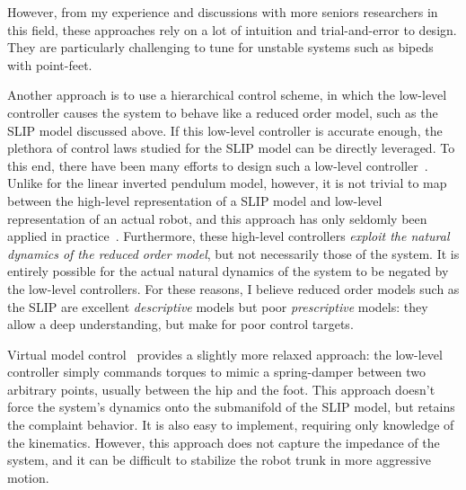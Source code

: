 However, from my experience and discussions with more seniors researchers in this field, these approaches rely on a lot of intuition and trial-and-error to design. They are particularly challenging to tune for unstable systems such as bipeds with point-feet. \par
Another approach is to use a hierarchical control scheme, in which the low-level controller causes the system to behave like a reduced order model, such as the SLIP model discussed above.
If this low-level controller is accurate enough, the plethora of control laws studied for the SLIP model can be directly leveraged. To this end, there have been many efforts to design such a low-level controller~\cite{hutter2010slip,poulakakis2009spring,wensing2013high}. Unlike for the linear inverted pendulum model, however, it is not trivial to map between the high-level representation of a SLIP model and low-level representation of an actual robot, and this approach has only seldomly been applied in practice~\cite{martin2017experimental}.
Furthermore, these high-level controllers \emph{exploit the natural dynamics of the reduced order model}, but not necessarily those of the system. It is entirely possible for the actual natural dynamics of the system to be negated by the low-level controllers.
For these reasons, I believe reduced order models such as the SLIP are excellent \emph{descriptive} models but poor \emph{prescriptive} models: they allow a deep understanding, but make for poor control targets. \par
Virtual model control~\cite{pratt2001virtual,renjewski2015exciting} provides a slightly more relaxed approach: the low-level controller simply commands torques to mimic a spring-damper between two arbitrary points, usually between the hip and the foot. This approach doesn't force the system's dynamics onto the submanifold of the SLIP model, but retains the complaint behavior. It is also easy to implement, requiring only knowledge of the kinematics. However, this approach does not capture the impedance of the system, and it can be difficult to stabilize the robot trunk in more aggressive motion.

